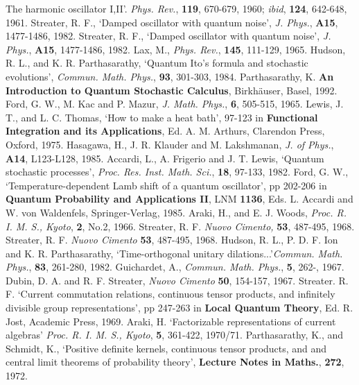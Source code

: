 The harmonic oscillator I,II'. {\em Phys. Rev.}, {\bf 119}, 670-679,
1960; {\em ibid}, {\bf 124}, 642-648, 1961.
 Streater, R. F., `Damped oscillator with quantum noise',
{\em J. Phys.}, {\bf A15}, 1477-1486, 1982. Streater, R. F., `Damped oscillator with quantum noise',
{\em J. Phys.}, {\bf A15}, 1477-1486, 1982.
 Lax, M., {\em Phys. Rev.}, {\bf 145}, 111-129, 1965.
 Hudson, R. L., and K. R. Parthasarathy, `Quantum Ito's
formula and stochastic evolutions', {\em Commun. Math. Phys.}, {\bf 93},
301-303, 1984.
 Parthasarathy, K. {\bf An Introduction to Quantum
Stochastic Calculus}, Birkh\"{a}user, Basel, 1992.
 Ford, G. W., M. Kac and P. Mazur, {\em J. Math. Phys.},
{\bf 6}, 505-515, 1965.
 Lewis, J. T., and L. C. Thomas, `How to make a heat
bath', 97-123 in {\bf Functional Integration and its Applications},
Ed. A. M. Arthurs, Clarendon Press, Oxford, 1975.
 Hasagawa, H., J. R. Klauder and M. Lakshmanan, {\em J. of
Phys.}, {\bf A14}, L123-L128, 1985.
 Accardi, L., A. Frigerio and J. T. Lewis, `Quantum
stochastic processes', {\em Proc. Res. Inst. Math. Sci.}, {\bf 18},
97-133, 1982.
 Ford, G. W., `Temperature-dependent Lamb shift of a quantum
oscillator', pp 202-206 in {\bf Quantum Probability and Applications II},
LNM {\bf 1136}, Eds. L. Accardi and W. von Waldenfels, Springer-Verlag, 1985.
 Araki, H., and E. J. Woods, {\em Proc. R. I. M. S., Kyoto},
{\bf 2}, No.2, 1966.
 Streater, R. F. {\em Nuovo Cimento,} {\bf 53}, 487-495,
1968.
 Streater, R. F. {\em Nuovo Cimento} {\bf 53}, 487-495, 1968.
 Hudson, R. L., P. D. F. Ion and K. R. Parthasarathy,
`Time-orthogonal unitary dilations...'{\em Commun. Math. Phys.},
{\bf 83}, 261-280, 1982.
 Guichardet, A., {\em Commun. Math. Phys.}, {\bf 5},
262-, 1967.
 Dubin, D. A. and R. F. Streater, {\em Nuovo Cimento} {\bf 50},
154-157, 1967.
 Streater. R. F. `Current commutation relations, continuous
tensor products, and infinitely divisible group representations', pp
247-263 in {\bf Local Quantum Theory}, Ed. R. Jost, Academic Press, 1969.
 Araki, H. `Factorizable representations of current algebras'
{\em Proc. R. I. M. S., Kyoto}, {\bf 5}, 361-422, 1970/71.
 Parthasarathy, K., and Schmidt, K., `Positive definite
kernels, continuous tensor products, and and central limit theorems of
probability theory', {\bf Lecture Notes in Maths.}, {\bf 272}, 1972.
